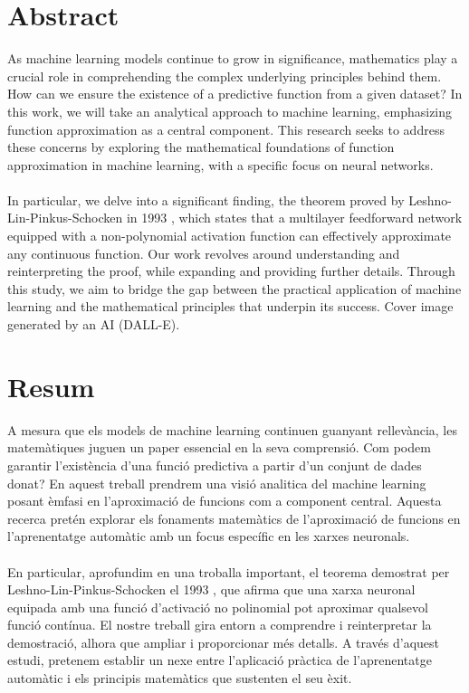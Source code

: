 \documentclass[../../main.tex]{subfiles}
\begin{document}
\section*{Abstract} %


\noindent As machine learning models continue to grow in significance, mathematics play a crucial role in comprehending the complex underlying principles behind them. How can we ensure the existence of a predictive function from a given dataset? In this work, we will take an analytical approach to machine learning, emphasizing function approximation as a central component. This research seeks to address these concerns by exploring the mathematical foundations of function approximation in machine learning, with a specific focus on neural networks.
\\ \\
In particular, we delve into a significant finding, the theorem proved by Leshno-Lin-Pinkus-Schocken in 1993 \cite{leshno1993multilayer}, which states that a multilayer feedforward network equipped with a non-polynomial activation function can effectively approximate any continuous function. Our work revolves around understanding and reinterpreting the proof, while expanding and providing further details.
Through this study, we aim to bridge the gap between the practical application of machine learning and the mathematical principles that underpin its success.
\vfill *Cover image generated by an AI (DALL-E).

\newpage

\section*{Resum}
\noindent A mesura que els models de machine learning continuen guanyant rellevància, les matemàtiques juguen un paper essencial en la seva comprensió. Com podem garantir l'existència d'una funció predictiva a partir d'un conjunt de dades donat?  En aquest treball prendrem una visió analitica del machine learning posant èmfasi en l'aproximació de funcions com a component central. Aquesta recerca pretén explorar els fonaments matemàtics de l'aproximació de funcions en l'aprenentatge automàtic amb un focus específic en les xarxes neuronals.
\\ \\
\noindent En particular, aprofundim en una troballa important, el teorema demostrat per Leshno-Lin-Pinkus-Schocken el 1993 \cite{leshno1993multilayer}, que afirma que una xarxa neuronal equipada amb una funció d'activació no polinomial pot aproximar qualsevol funció contínua. El nostre treball gira entorn a comprendre i reinterpretar la demostració, alhora que ampliar i proporcionar més detalls.
A través d'aquest estudi, pretenem establir un nexe entre l'aplicació pràctica de l'aprenentatge automàtic i els principis matemàtics que sustenten el seu èxit.
\end{document}
